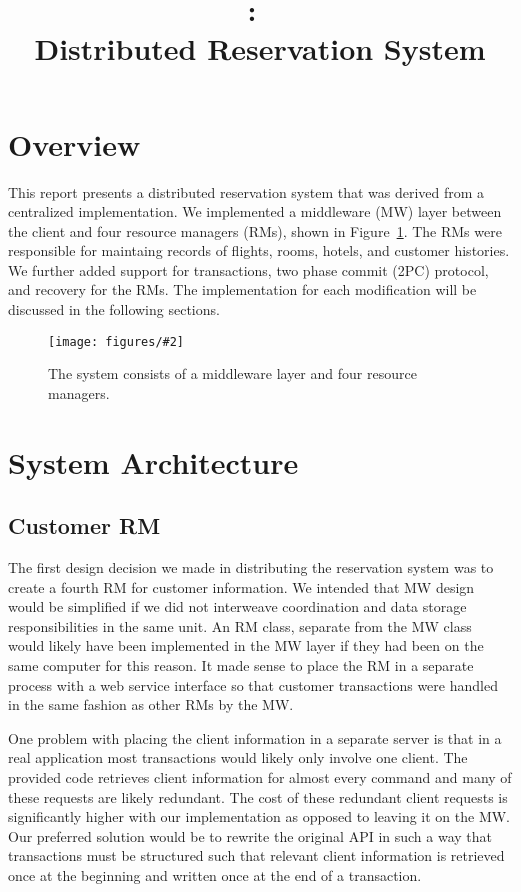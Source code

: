 \documentclass{article}
\title{
\vspace{2in}
\textmd{\textbf{\hmwkClass:\ \hmwkTitle}}\\
\textmd{\textbf{Distributed Reservation System}}\\
\vspace{3in}
}
\author{\textbf{\hmwkAuthorName}}
\date{} %
\newcommand{\addfigure}[4]{

\begin{figure}[h]
	\centering
	\texttt{[image: figures/\#2]}
	\caption{#3}
	\label{#4}
\end{figure}

}
\begin{document}
\maketitle
\thispagestyle{empty}
\newpage
\setcounter{page}{1}


\section{Overview}

This report presents a distributed reservation system that was derived from a centralized implementation. We implemented a middleware (MW) layer between the client and four resource managers (RMs), shown in Figure~\ref{f:arch}. The RMs were responsible for maintaing records of flights, rooms, hotels, and customer histories. We further added support for transactions, two phase commit (2PC) protocol, and recovery for the RMs. The implementation for each modification will be discussed in the following sections.


\addfigure{0.5}{arch.pdf}{The system consists of a middleware layer and four resource managers.}{f:arch}


\section{System Architecture}

\subsection{Customer RM}
The first design decision we made in distributing the reservation system was to create a fourth RM for customer information.
We intended that MW design would be simplified if we did not interweave coordination and data storage responsibilities in the same unit.
An RM class, separate from the MW class would likely have been implemented in the MW layer if they had been on the same computer for this reason. 
It made sense to place the RM in a separate process with a web service interface so that customer transactions were handled in the same fashion as other RMs by the MW.

One problem with placing the client information in a separate server is that in a real application most transactions would likely only involve one client. The provided code retrieves client information for almost every command and many of these requests are likely redundant. The cost of these redundant client requests is significantly higher with our implementation as opposed to leaving it on the MW. Our preferred solution would be to rewrite the original API in such a way that transactions must be structured such that relevant client information is retrieved once at the beginning and written once at the end of a transaction.
\end{document}
